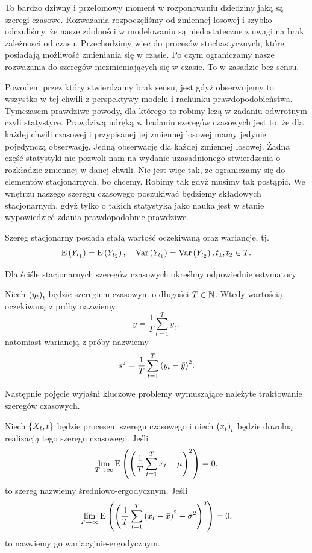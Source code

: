 \documentclass[10pt,a4paper]{book}
\begin{document}
\begin{remark*}
To bardzo dziwny i przełomowy moment w rozponawaniu dziedziny jaką są szeregi czasowe. Rozważania rozpoczęliśmy od zmiennej losowej i szybko odczuliśmy, że nasze zdolności w modelowaniu są niedostateczne z uwagi na brak zależnosci od czasu. Przechodzimy więc do procesów stochastycznych, które posiadają możliwość zmieniania się w czasie. Po czym ograniczamy nasze rozważania do szeregów niezmieniających się w czasie. To w zasadzie bez sensu. 

Powodem przez który stwierdzamy brak sensu, jest gdyż obserwujemy to wszystko w tej chwili z perspektywy modelu i rachunku prawdopodobieństwa. Tymczasem prawdziwe powody, dla którego to robimy leżą w zadaniu odwrotnym czyli statystyce. Prawdziwą udręką w badaniu szeregów czasowych jest to, że dla każdej chwili czasowej i przypisanej jej zmiennej losowej mamy jedynie pojedynczą obserwację. Jedną obserwację dla każdej zmiennej losowej. Żadna część statystyki nie pozwoli nam na wydanie uzasadnionego stwierdzenia o rozkładzie zmiennej w danej chwili. Nie jest więc tak, że ograniczamy się do elementów stacjonarnych, bo chcemy. Robimy tak gdyż musimy tak postąpić. We wnętrzu naszego szeregu czasowego poszukiwać będziemy składowych stacjonarnych, gdyż tylko o takich statystyka jako nauka jest w stanie wypowiedzieć zdania prawdopodobnie prawdziwe.
\end{remark*}

\begin{proposition}
Szereg stacjonarny posiada stałą wartość oczekiwaną oraz wariancję, tj.
$$
\operatorname{E} \left({Y_{t_1}} \right) = \operatorname{E} \left({Y_{t_2}} \right) , \quad \operatorname{Var} \left( {Y_{t_1}} \right) = \operatorname{Var} \left( {Y_{t_2}} \right), t_1, t_2 \in T.
$$
\end{proposition}

Dla ściśle stacjonarnych szeregów czasowych określmy odpowiednie estymatory

\begin{definition}
Niech $\left( {y_t} \right)_{t}^{}$ będzie szeregiem czasowym o długości $T \in \mathbb{N}$. Wtedy wartością oczekiwaną z próby nazwiemy
$$
\bar{y} = \frac{1}{T} \sum_{t=1}^{T} y_t,
$$
natomiast wariancją z próby nazwiemy
$$
s^2 = \frac{1}{T} \sum_{t=1}^{T} \bracket{y_t - \bar{y}}^2.
$$
\end{definition}

Następnie pojęcie wyjaśni kluczowe problemy wymuszające należyte traktowanie szeregów czasowych.

\begin{definition}
Niech $\left\lbrace {{X_t}, {t}} \right\rbrace$ będzie procesem szeregu czasowego i niech $\left({x_t}\right)_{t}$ będzie dowolną realizacją tego szeregu czasowego. Jeśli
$$
\lim_{T \to \infty} \Ex{\bracket{ \frac{1}{T} \sum_{t=1}^{T} x_t  - \mu }^2} = 0,
$$  
to szereg nazwiemy średniowo-ergodycznym. Jeśli
$$
\lim_{T \to \infty} \Ex{\bracket{ \frac{1}{T} \sum_{t=1}^{T} \bracket{x_t - \bar{x}}^2  - \sigma^2 }^2} = 0,
$$
to nazwiemy go wariacyjnie-ergodycznym.
\end{definition}
\end{document}
